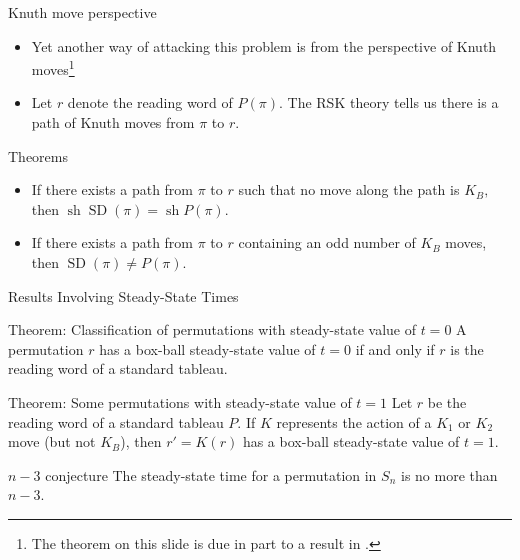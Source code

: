 \documentclass[aspectratio=169, serif]{beamer}
\DeclareMathOperator{\SD}{SD}
\DeclareMathOperator{\sh}{sh}
\begin{document}
\begin{frame}{Knuth move perspective}
    \begin{itemize}
            \item Yet another way of attacking this problem is from the perspective of Knuth moves\footnote[frame]{The theorem on this slide is due in part to a result in \cite{LLPS19}.}
            \item Let $r$ denote the reading word of $P(\pi).$ The RSK theory tells us there is a path of Knuth moves from $\pi$ to $r.$
        \end{itemize}
        \begin{alertblock}{Theorems}
        \begin{itemize}
            \item If there exists a path from $\pi$ to $r$ such that no move along the path is $K_B,$ then $\sh\SD(\pi)=\sh P(\pi).$
            \item If there exists a path from $\pi$ to $r$ containing an odd number of $K_B$ moves, then $\SD(\pi)\neq P(\pi).$
        \end{itemize}
    \end{alertblock}
    
\end{frame}
\begin{frame}{Results Involving Steady-State Times}
    \begin{alertblock}{Theorem: Classification of permutations with steady-state value of $t=0$}
    A permutation $r$ has a box-ball steady-state value of $t=0$ if and only if $r$ is the reading word of a standard tableau.
    \end{alertblock}
    \begin{alertblock}{Theorem: Some permutations with steady-state value of $t=1$}
     Let $r$ be the reading word of a standard tableau $P$. If $K$ represents the action of a $K_1$ or $K_2$ move (but not $K_B$), then $r'=K(r)$ has a box-ball steady-state value of $t=1.$
    \end{alertblock}
    \small
    \begin{block}{$n-3$ conjecture}
        The steady-state time for a permutation in $S_n$ is no more than $n-3.$
    \end{block}
\end{frame}
\end{document}
